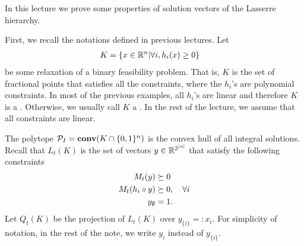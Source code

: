 \documentclass[a4paper,twoside,justified]{tufte-handout}
\begin{document}
 

In this lecture we prove some properties of solution vectors of
the Lasserre hierarchy.

First, we recall the notations defined in previous lectures.
Let
\begin{alignat}{2}
  K &= \left\{ x \in \RR^n | \forall i, h_i(x) \ge 0 \right\} \label{eq:setK}
\end{alignat}
be some relaxation of a binary feasibility problem.
That is, $K$ is the set of fractional points that satisfies all the constraints,
where the $h_i$'s are polynomial constraints. In most of the previous
examples, all $h_i$'s are linear and therefore $K$ is a .
Otherwise, we usually call $K$ a .
In the rest of the lecture, we assume that all constraints are linear.

The polytope $\mathcal{P}_{I}=\mathbf{conv}(K \cap \{0,1\}^n)$ is the convex hull of
all integral solutions. Recall that 
$L_t(K)$ is the set of vectors $y \in \mathbb{R}^{2^{[n]}}$
that satisfy the following constraints
\begin{alignat}{2}
  M_t(y) & \succeq 0  \notag \\
  M_t(h_i \circ y) & \succeq 0, \quad \forall i \label{eq:lasserre-definition} \\
  y_{\emptyset} &= 1 \notag.
\end{alignat}
Let $Q_t(K)$ be the projection of $L_t(K)$ over $y_{\{i\}}=:x_i$.
For simplicity of notation, in the rest of the note, we 
write $y_i$ instead of $y_{\{i\}}$.
\end{document}
